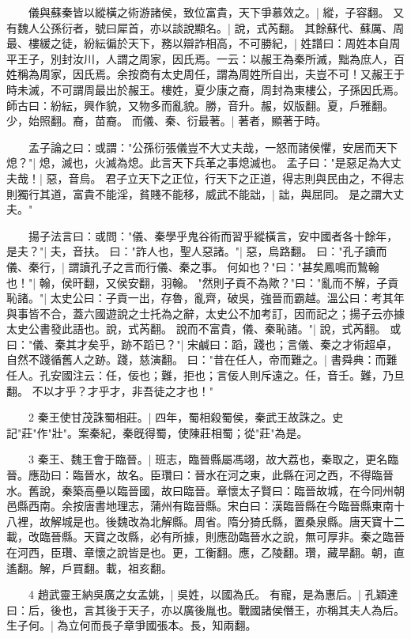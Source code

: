 　　儀與蘇秦皆以縱橫之術游諸侯，致位富貴，天下爭慕效之。|{
	縱，子容翻。
	}
又有魏人公孫衍者，號曰犀首，亦以談說顯名。|{
	說，式芮翻。
	}
其餘蘇代、蘇厲、周最、樓緩之徒，紛紜徧於天下，務以辯詐相高，不可勝紀，|{
	姓譜曰：周姓本自周平王子，別封汝川，人謂之周家，因氏焉。一云：以赧王為秦所滅，黜為庶人，百姓稱為周家，因氏焉。余按商有太史周任，謂為周姓所自出，夫豈不可！又赧王于時未滅，不可謂周最出於赧王。樓姓，夏少康之裔，周封為東樓公，子孫因氏焉。師古曰：紛紜，興作貌，又物多而亂貌。勝，音升。赧，奴版翻。夏，戶雅翻。少，始照翻。裔，苗裔。
	}
而儀、秦、衍最著。|{
	著者，顯著于時。
	}

　　孟子論之曰：或謂："公孫衍張儀豈不大丈夫哉，一怒而諸侯懼，安居而天下熄？"|{
	熄，滅也，火滅為熄。此言天下兵革之事熄滅也。
	}
孟子曰："是惡足為大丈夫哉！|{
	惡，音烏。
	}
君子立天下之正位，行天下之正道，得志則與民由之，不得志則獨行其道，富貴不能淫，貧賤不能移，威武不能詘，|{
	詘，與屈同。
	}
是之謂大丈夫。"

　　揚子法言曰：或問："儀、秦學乎鬼谷術而習乎縱橫言，安中國者各十餘年，是夫？"|{
	夫，音扶。
	}
曰："詐人也，聖人惡諸。"|{
	惡，烏路翻。
	}
曰："孔子讀而儀、秦行，|{
	謂讀孔子之言而行儀、秦之事。
	}
何如也？"曰："甚矣鳳鳴而鷙翰也！"|{
	翰，侯旰翻，又侯安翻，羽翰。
	}
"然則子貢不為歟？"曰："亂而不解，子貢恥諸。"|{
	太史公曰：子貢一出，存魯，亂齊，破吳，強晉而霸越。溫公曰：考其年與事皆不合，蓋六國遊說之士托為之辭，太史公不加考訂，因而記之；揚子云亦據太史公書發此語也。說，式芮翻。
	}
說而不富貴，儀、秦恥諸。"|{
	說，式芮翻。
	}
或曰："儀、秦其才矣乎，跡不蹈已？"|{
	宋鹹曰：蹈，踐也；言儀、秦之才術超卓，自然不踐循舊人之跡。踐，慈演翻。
	}
曰："昔在任人，帝而難之。|{
	書舜典：而難任人。孔安國注云：任，佞也；難，拒也；言佞人則斥遠之。任，音壬。難，乃旦翻。
	}
不以才乎？才乎才，非吾徒之才也！"

　　2 秦王使甘茂誅蜀相莊。|{
	四年，蜀相殺蜀侯，秦武王故誅之。史記"莊"作"壯"。案秦紀，秦旣得蜀，使陳莊相蜀；從"莊"為是。
	}

　　3 秦王、魏王會于臨晉。|{
	班志，臨晉縣屬馮翊，故大荔也，秦取之，更名臨晉。應劭曰：臨晉水，故名。臣瓚曰：晉水在河之東，此縣在河之西，不得臨晉水。舊說，秦築高壘以臨晉國，故曰臨晉。章懷太子賢曰：臨晉故城，在今同州朝邑縣西南。余按唐書地理志，蒲州有臨晉縣。宋白曰：漢臨晉縣在今臨晉縣東南十八裡，故解城是也。後魏改為北解縣。周省。隋分猗氏縣，置桑泉縣。唐天寶十二載，改臨晉縣。天寶之改縣，必有所據，則應劭臨晉水之說，無可厚非。秦之臨晉在河西，臣瓚、章懷之說皆是也。更，工衡翻。應，乙陵翻。瓚，藏旱翻。朝，直遙翻。解，戶買翻。載，祖亥翻。
	}

　　4 趙武靈王納吳廣之女孟姚，|{
	吳姓，以國為氏。
	}
有寵，是為惠后。|{
	孔穎達曰：后，後也，言其後于天子，亦以廣後胤也。戰國諸侯僭王，亦稱其夫人為后。
	}
生子何。|{
	為立何而長子章爭國張本。長，知兩翻。
	}

